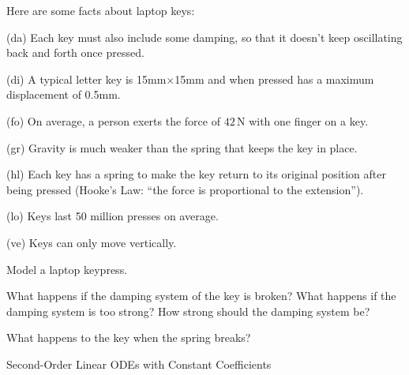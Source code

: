\newpage

\question
	Here are some facts about laptop keys:

\begin{itemize}
\begin{minipage}{.4\textwidth}
\item[(da)] Each key must also include some damping, so that it doesn't keep oscillating back and forth once pressed.

\item[(di)] A typical letter key is 15mm$\times$15mm and when pressed has a maximum displacement of 0.5mm.

\item[(fo)] On average, a person exerts the force of $42\,$N with one finger on a key.
\end{minipage}
\hfill
\begin{minipage}{.4\textwidth}
\item[(gr)] Gravity is much weaker than the spring that keeps the key in place.

\item[(hl)] Each key has a spring to make the key return to its original position after being pressed (Hooke's Law: ``the force is proportional to the extension'').

\item[(lo)] Keys last 50 million presses on average.

\item[(ve)] Keys can only move vertically.
\end{minipage}
\end{itemize}
	
	
\begin{parts}
	\item Model a laptop keypress.
	\item What happens if the damping system of the key is broken? What happens if the damping system is too strong? How strong should the damping system be?
	\item What happens to the key when the spring breaks?
\end{parts}









%
%



\begin{module}{Second-Order Linear ODEs with Constant Coefficients}
	\label{2nd:solving}

	
	
\end{module}



